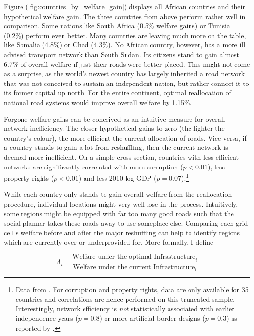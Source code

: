 \documentclass[11pt, oneside]{article}   	%
\let\oldref\ref
\renewcommand{\ref}[1]{(\oldref{#1})}
\begin{document}
Figure \ref{fig:countries_by_welfare_gain} displays all African countries and their hypothetical welfare gain. The three countries from above perform rather well in comparison. Some nations like South Africa (0.5\% welfare gains) or Tunisia (0.2\%) perform even better. Many countries are leaving much more on the table, like Somalia (4.8\%) or Chad (4.3\%). No African country, however, has a more ill advised transport network than South Sudan. Its citizens stand to gain almost 6.7\% of overall welfare if just their roads were better placed. This might not come as a surprise, as the world's newest country has largely inherited a road network that was not conceived to sustain an independent nation, but rather connect it to its former capital up north. For the entire continent, optimal reallocation of national road systems would improve overall welfare by 1.15\%.

Forgone welfare gains can be conceived as an intuitive measure for overall network inefficiency. The closer hypothetical gains to zero (the lighter the country's colour), the more efficient the current allocation of roads. Vice-versa, if a country stands to gain a lot from reshuffling, then the current network is deemed more inefficient. On a simple cross-section, countries with less efficient networks are significantly correlated with more corruption ($p < 0.01$), less property rights ($p < 0.01$) and less 2010 log GDP ($p=0.07$).\footnote{Data from \cite{TheWorldBank_WorldBankAnnual_2017}. For corruption and property rights, data are only available for 35 countries and correlations are hence performed on this truncated sample. Interestingly, network efficiency is \emph{not} statistically associated with earlier independence years ($p=0.8$) or more artificial border designs ($p=0.3$) as reported by \cite{Alesina_ArtificialStates_2011}.}

While each country only stands to gain overall welfare from the reallocation procedure, individual locations might very well lose in the process. Intuitively, some regions might be equipped with far too many good roads such that the social planner takes these roads away to use someplace else. Comparing each grid cell's welfare before and after the major reshuffling can help to identify regions which are currently over or underprovided for. More formally, I define

\begin{equation}
  \Lambda_{i} = \frac{\textrm{Welfare under the optimal Infrastructure}_{i}}{\textrm{Welfare under the current Infrastructure}_{i}}
\end{equation}
\end{document}
